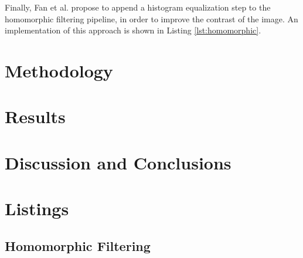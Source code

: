 \documentclass[sigconf]{acmart}
\begin{document}
Finally, Fan et al. \cite{fan2011homomorphic} propose  to append a histogram equalization step to the homomorphic filtering pipeline, in order to improve the contrast of the image. An implementation of this approach is shown in Listing \ref{lst:homomorphic}.


\section{Methodology}\label{sec:method}

\section{Results}\label{sec:results}


\section{Discussion and Conclusions}


\appendix

\section{Listings}
\subsection{Homomorphic Filtering}\label{sec:homomorphic-listing}
\begin{mdframed}[backgroundcolor=backcolour,leftmargin=0cm,hidealllines=true,innerleftmargin=0cm,innerrightmargin=0cm,innertopmargin=0cm,innerbottommargin=-0.65cm]

\end{mdframed}





\newpage
\appendix
\end{document}
